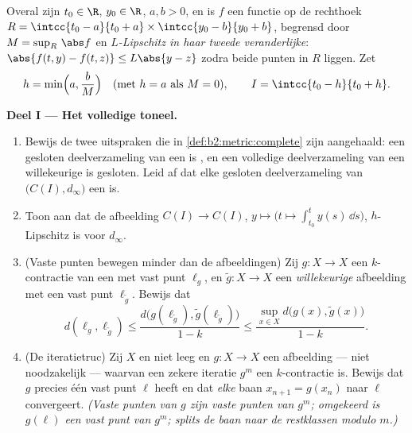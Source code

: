 \begin{problem}
\label{pb:b2:metric:1}
Overal zijn $t_0 \in \R$, $y_0 \in \R$, $a, b > 0$, en is $f$ een
 functie op de rechthoek $R = \intcc{t_0 - a}{t_0 + a}
\times \intcc{y_0 - b}{y_0 + b}$, begrensd door $M = \sup_R\,\abs
f$ en \emph{$L$-Lipschitz in haar tweede veranderlijke}:
$\abs{f(t, y) - f(t, z)} \leq L\abs{y - z}$ zodra beide punten in
$R$ liggen. Zet
\[
h = \min\Bigl(a, \frac bM\Bigr) \quad (\text{met } h = a
\text{ als } M = 0), \qquad I = \intcc{t_0 - h}{t_0 + h}.
\]

\medskip
\noindent\textbf{Deel I --- Het volledige toneel.}
\begin{enumerate}
  \item Bewijs de twee uitspraken die in
        \cref{def:b2:metric:complete} zijn aangehaald: een
        gesloten deelverzameling van een  is , en een volledige deelverzameling van
        een willekeurige  is gesloten. Leid af dat
        elke gesloten deelverzameling van $\bigl(C(I),
        d_\infty\bigr)$ een  is.
  \item Toon aan dat de afbeelding $C(I) \to C(I)$, $y \mapsto
        \bigl(t \mapsto \int_{t_0}^{t}y(s)\,\dd s\bigr)$,
        $h$-Lipschitz is voor $d_\infty$.
  \item (Vaste punten bewegen minder dan de afbeeldingen) Zij $g
        \colon X \to X$ een $k$-contractie van een  met vast punt $\ell_g$, en $\widetilde g \colon X
        \to X$ een \emph{willekeurige} afbeelding met een vast
        punt $\ell_{\widetilde g}$. Bewijs dat
        \[
        d(\ell_g, \ell_{\widetilde g}) \leq
        \frac{d\bigl(g(\ell_{\widetilde g}),
        \widetilde g(\ell_{\widetilde g})\bigr)}{1 - k}
        \leq \frac{\sup_{x \in X} d\bigl(g(x), \widetilde
        g(x)\bigr)}{1 - k}.
        \]
  \item (De iteratietruc) Zij $X$  en niet leeg en $g
        \colon X \to X$ een afbeelding --- niet noodzakelijk
         --- waarvan een zekere iteratie $g^m$ een
        $k$-contractie is. Bewijs dat $g$ precies één vast punt
        $\ell$ heeft en dat \emph{elke} baan $x_{n+1} = g(x_n)$
        naar $\ell$ convergeert. \emph{(Vaste punten van $g$ zijn
        vaste punten van $g^m$; omgekeerd is $g(\ell)$ een vast
        punt van $g^m$; splits de baan naar de restklassen modulo
        $m$.)}
\end{enumerate}


\end{problem}
